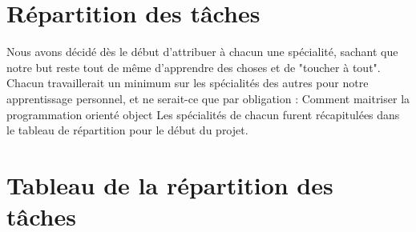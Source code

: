 \documentclass[12pt]{report}
\begin{document}
        \section{Répartition des tâches} 
            Nous avons décidé dès le début d'attribuer à chacun une
            spécialité, sachant que notre but reste tout de même d'apprendre
            des choses et de "toucher à tout". Chacun travaillerait un minimum
            sur les spécialités des autres pour notre apprentissage personnel,
            et ne serait-ce que par obligation : Comment maitriser la programmation orienté object
            Les spécialités de chacun furent récapitulées dans le tableau de répartition pour le début du projet.\\
        \section{Tableau de la répartition des tâches}
\end{document}
